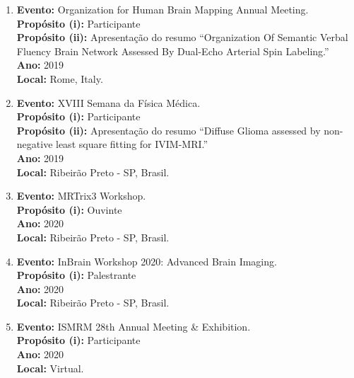 \documentclass[a4paper,oneside,10pt]{article}
\begin{document}
\begin{enumerate}
        \item   \textbf{Evento:} Organization for Human Brain Mapping Annual Meeting. \mbox{} \\
        \textbf{Propósito (i):} Participante \\
        \textbf{Propósito (ii):} Apresentação do resumo ``Organization Of Semantic Verbal Fluency Brain Network Assessed By Dual-Echo Arterial Spin Labeling.''\\
        \textbf{Ano:} 2019\\
        \textbf{Local:} Rome, Italy.

        \item   \textbf{Evento:} XVIII Semana da Física Médica. \mbox{} \\
        \textbf{Propósito (i):} Participante\\
        \textbf{Propósito (ii):} Apresentação do resumo ``Diffuse Glioma assessed by non-negative least square fitting for IVIM-MRI.''\\
        \textbf{Ano:} 2019\\
        \textbf{Local:} Ribeirão Preto - SP, Brasil.

        \item   \textbf{Evento:} MRTrix3 Workshop. \mbox{} \\
        \textbf{Propósito (i):} Ouvinte\\
        \textbf{Ano:} 2020\\
        \textbf{Local:} Ribeirão Preto - SP, Brasil.

        \item   \textbf{Evento:} InBrain Workshop 2020: Advanced Brain Imaging. \mbox{} \\
        \textbf{Propósito (i):} Palestrante\\
        \textbf{Ano:} 2020\\
        \textbf{Local:} Ribeirão Preto - SP, Brasil.

        \item   \textbf{Evento:} ISMRM 28th Annual Meeting \& Exhibition. \mbox{} \\
        \textbf{Propósito (i):} Participante \\
        \textbf{Ano:} 2020\\
        \textbf{Local:} Virtual.


\end{enumerate}
\end{document}
